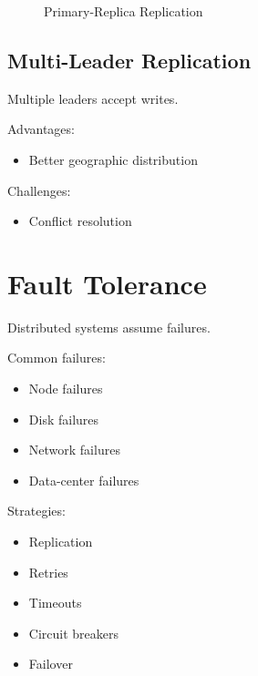 \begin{figure}[H]
\centering
{}
\caption{Primary-Replica Replication}
\end{figure}

\subsection{Multi-Leader Replication}

Multiple leaders accept writes.

Advantages:

\begin{itemize}
\item Better geographic distribution
\end{itemize}

Challenges:

\begin{itemize}
\item Conflict resolution
\end{itemize}

\section{Fault Tolerance}

Distributed systems assume failures.

Common failures:

\begin{itemize}
\item Node failures
\item Disk failures
\item Network failures
\item Data-center failures
\end{itemize}

Strategies:

\begin{itemize}
\item Replication
\item Retries
\item Timeouts
\item Circuit breakers
\item Failover
\end{itemize}

